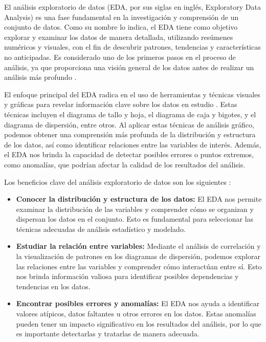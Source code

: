 El análisis exploratorio de datos (EDA, por sus siglas en inglés, Exploratory Data Analysis) es una fase fundamental en la investigación y comprensión de un conjunto de datos. Como su nombre lo indica, el EDA tiene como objetivo explorar y examinar los datos de manera detallada, utilizando resúmenes numéricos y visuales, con el fin de descubrir patrones, tendencias y características no anticipadas. Es considerado uno de los primeros pasos en el proceso de análisis, ya que proporciona una visión general de los datos antes de realizar un análisis más profundo \cite{ruiz2022exploratorio}.

El enfoque principal del EDA radica en el uso de herramientas y técnicas visuales y gráficas para revelar información clave sobre los datos en estudio \cite{parra2002exploratorio}. Estas técnicas incluyen el diagrama de tallo y hoja, el diagrama de caja y bigotes, y el diagrama de dispersión, entre otros. Al aplicar estas técnicas de análisis gráfico, podemos obtener una comprensión más profunda de la distribución y estructura de los datos, así como identificar relaciones entre las variables de interés. Además, el EDA nos brinda la capacidad de detectar posibles errores o puntos extremos, como anomalías, que podrían afectar la calidad de los resultados del análisis.

Los beneficios clave del análisis exploratorio de datos son los siguientes \cite{ruiz2022exploratorio}:
\begin{itemize}
    \item \textbf{Conocer la distribución y estructura de los datos:} El EDA nos permite examinar la distribución de las variables y comprender cómo se organizan y dispersan los datos en el conjunto. Esto es fundamental para seleccionar las técnicas adecuadas de análisis estadístico y modelado.
    \item \textbf{Estudiar la relación entre variables:} Mediante el análisis de correlación y la visualización de patrones en los diagramas de dispersión, podemos explorar las relaciones entre las variables y comprender cómo interactúan entre sí. Esto nos brinda información valiosa para identificar posibles dependencias y tendencias en los datos.
    \item \textbf{Encontrar posibles errores y anomalías:} El EDA nos ayuda a identificar valores atípicos, datos faltantes u otros errores en los datos. Estas anomalías pueden tener un impacto significativo en los resultados del análisis, por lo que es importante detectarlas y tratarlas de manera adecuada.
\end{itemize}